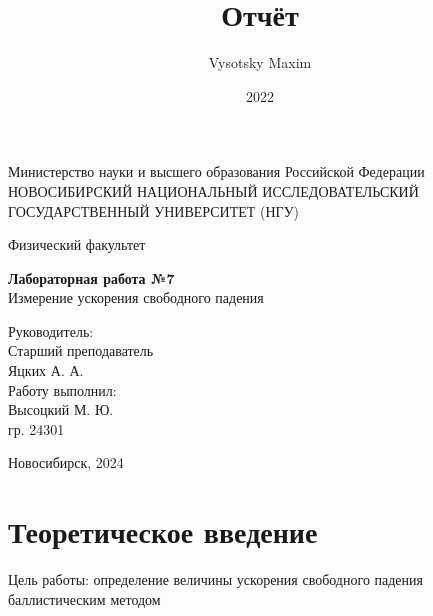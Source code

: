 \documentclass[a4paper,12pt]{article}
\author{Vysotsky Maxim}
\title{Отчёт}
\date{2022}
\begin{document}
	\begin{titlepage}
		\begin{center}
			{Министерство науки и высшего образования Российской Федерации
				НОВОСИБИРСКИЙ НАЦИОНАЛЬНЫЙ ИССЛЕДОВАТЕЛЬСКИЙ
				ГОСУДАРСТВЕННЫЙ УНИВЕРСИТЕТ (НГУ)}
		\end{center}
		\begin{center}
			{Физический факультет}
		\end{center}
		
		
		\vspace{8cm}
		{
			\begin{center}
				{\bf Лабораторная работа №7}\\
				Измерение ускорения свободного падения
			\end{center}
		}
		\vspace{2cm}
		\begin{flushright}
			{Руководитель:\\ Старший преподаватель\\
				Яцких А. А.\\
				Работу выполнил:\\
				Высоцкий М. Ю.\\
				\vspace{0.2cm}
				гр. 24301}
		\end{flushright}
		\vspace{3cm}
		\begin{center}
			Новосибирск, 2024
		\end{center}
	\end{titlepage}

\section{Теоретическое введение}
Цель работы: определение величины ускорения свободного падения баллистическим методом 
\end{document}
